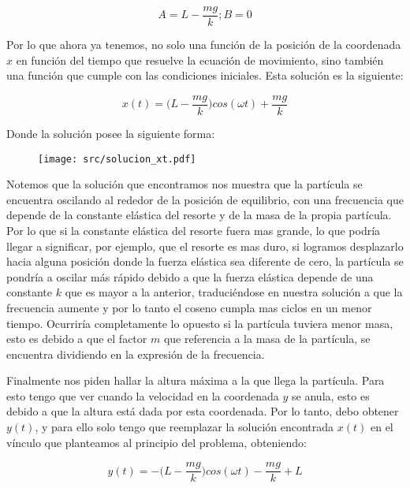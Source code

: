 \documentclass{article}
\begin{document}
\begin{multicols}{2}
\begin{equation}
    A = L - \frac{mg}{k} ; B = 0
\end{equation}

Por lo que ahora ya tenemos, no solo una función de la posición de la coordenada $x$ en función del tiempo que resuelve la ecuación de movimiento, sino también una función que cumple con las condiciones iniciales. Esta solución es la siguiente:

\begin{equation}
    x(t) = \bigg( L - \frac{mg}{k} \bigg)cos(\omega t) + \frac{mg}{k}
\end{equation}

Donde la solución posee la siguiente forma:

\begin{figure}[H]
    \centering
    \texttt{[image: src/solucion\_xt.pdf]}
\end{figure}

Notemos que la solución que encontramos nos muestra que la partícula se encuentra oscilando al rededor de la posición de equilibrio, con una frecuencia que depende de la constante elástica del resorte y de la masa de la propia partícula. Por lo que si la constante elástica del resorte fuera mas grande, lo que podría llegar a significar, por ejemplo, que el resorte es mas duro, si logramos desplazarlo hacia alguna posición donde la fuerza elástica sea diferente de cero, la partícula se pondría a oscilar más rápido debido a que la fuerza elástica depende de una constante $k$ que es mayor a la anterior, traduciéndose en nuestra solución a que la frecuencia aumente y por lo tanto el coseno cumpla mas ciclos en un menor tiempo. Ocurriría completamente lo opuesto si la partícula tuviera menor masa, esto es debido a que el factor $m$ que referencia a la masa de la partícula, se encuentra dividiendo en la expresión de la frecuencia.

Finalmente nos piden hallar la altura máxima a la que llega la partícula. Para esto tengo que ver cuando la velocidad en la coordenada $y$ se anula, esto es debido a que la altura está dada por esta coordenada. Por lo tanto,  debo obtener $y(t)$, y para ello solo tengo que reemplazar la solución encontrada $x(t)$ en el vínculo que planteamos al principio del problema, obteniendo:

\begin{equation}
    y(t) = - \bigg( L - \frac{mg}{k} \bigg)cos(\omega t) - \frac{mg}{k} + L
\end{equation}


\end{multicols}
\end{document}
